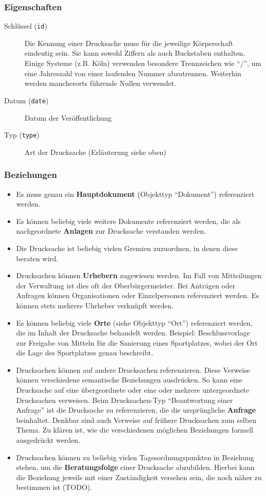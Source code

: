 \documentclass[,a4paper]{article}
\begin{document}
\subsubsection{Eigenschaften}

\begin{description}
\item[Schlüssel (\texttt{id})]
Die Kennung einer Drucksache muss für die jeweilige Körperschaft
eindeutig sein. Sie kann sowohl Ziffern als auch Buchstaben enthalten.
Einige Systeme (z.B. Köln) verwenden besondere Trennzeichen wie ``/'',
um eine Jahreszahl von einer laufenden Nummer abzutrennen. Weiterhin
werden mancherorts führende Nullen verwendet.
\item[Datum (\texttt{date})]
Datum der Veröffentlichung
\item[Typ (\texttt{type})]
Art der Drucksache (Erläuterung siehe oben)
\end{description}

\subsubsection{Beziehungen}

\begin{itemize}
\item
  Es muss genau ein \textbf{Hauptdokument} (Objekttyp ``Dokument'')
  referenziert werden.
\item
  Es können beliebig viele weitere Dokumente referenziert werden, die
  als nachgeordnete \textbf{Anlagen} zur Drucksache verstanden werden.
\item
  Die Drucksache ist beliebig vielen Gremien zuzuordnen, in denen diese
  beraten wird.
\item
  Drucksachen können \textbf{Urhebern} zugewiesen werden. Im Fall von
  Mitteilungen der Verwaltung ist dies oft der Oberbürgermeister. Bei
  Anträgen oder Anfragen können Organisationen oder Einzelpersonen
  referenziert werden. Es können stets mehrere Uhrheber verknüpft
  werden.
\item
  Es können beliebig viele \textbf{Orte} (siehe Objekttyp ``Ort'')
  referenziert werden, die im Inhalt der Drucksache behandelt werden.
  Beispiel: Beschlussvorlage zur Freigabe von Mitteln für die Sanierung
  eines Sportplatzes, wobei der Ort die Lage des Sportplatzes genau
  beschreibt.
\item
  Drucksachen können auf andere Drucksachen referenzieren. Diese
  Verweise können verschiedene semantische Beziehungen ausdrücken. So
  kann eine Drucksache auf eine übergeordnete oder eine oder mehrere
  untergeordnete Drucksachen verweisen. Beim Drucksachen-Typ
  ``Beantwortung einer Anfrage'' ist die Drucksache zu referenzieren,
  die die ursprüngliche \textbf{Anfrage} beinhaltet. Denkbar sind auch
  Verweise auf frühere Drucksachen zum selben Thema. Zu klären ist, wie
  die verschiedenen möglichen Beziehungen formell ausgedrückt werden.
\item
  Drucksachen können zu beliebig vielen Tagesordnungspunkten in
  Beziehung stehen, um die \textbf{Beratungsfolge} einer Drucksache
  abzubilden. Hierbei kann die Beziehung jeweils mit einer Zuständigkeit
  versehen sein, die noch näher zu bestimmen ist (TODO).
\end{itemize}
\end{document}
